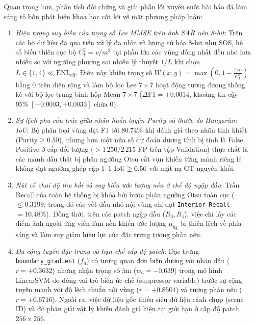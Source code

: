 Quan trọng hơn, phân tích đối chứng và giải phẫu lỗi xuyên suốt bài báo đã làm sáng tỏ bốn phát hiện khoa học cốt lõi về mặt phương pháp luận:
\begin{enumerate}
    \item \textit{Hiện tượng suy biến của trọng số Lee MMSE trên ảnh SAR nén 8-bit}: Trên các bộ dữ liệu đã qua tiền xử lý đa nhìn và lượng tử hóa 8-bit như SOS, hệ số biến thiên cục bộ $C_I^2 = v/m^2$ tại phần lớn các vùng đồng nhất đều nhỏ hơn nhiều so với ngưỡng phương sai nhiễu lý thuyết $1/L$ khi chọn $L \in \{1, 4\} \ll \text{ENL}_{\text{eff}}$. Điều này khiến trọng số $W(x, y) = \max(0, 1 - \frac{1/L}{C_I^2})$ bằng $0$ trên diện rộng và làm bộ lọc Lee $7 \times 7$ hoạt động tương đương thống kê với bộ lọc trung bình hộp Mean $7 \times 7$ ($\Delta\text{F1} = +0.0014$, khoảng tin cậy 95\% $[-0.0003, +0.0033]$ chứa 0).
    \item \textit{Sự lệch pha cấu trúc giữa nhãn huấn luyện Purity và thước đo Hungarian IoU}: Bộ phân loại vùng đạt F1 tới $80.74\%$ khi đánh giá theo nhãn tinh khiết ($\mathrm{Purity} \ge 0.50$), nhưng hơn một nửa số dự đoán dương tính bị tính là False Positive ở cấp đối tượng ($>1\,250 / 2\,215$ FP trên tập Validation) thực chất là các mảnh dầu thật bị phân ngưỡng Otsu cắt vụn khiến từng mảnh riêng lẻ không đạt ngưỡng ghép cặp 1--1 $\mathrm{IoU} \ge 0.50$ với mặt nạ GT nguyên khối.
    \item \textit{Nút cổ chai độ thu hồi và suy biến ước lượng nền ở chế độ ngập dầu}: Trần Recall của toàn hệ thống bị khóa bởi bước phân ngưỡng Otsu toàn cục ($\le 0.3199$, trong đó các vết dầu nhỏ nội vùng chỉ đạt \texttt{Interior Recall} $= 10.48\%$). Đồng thời, trên các patch ngập dầu ($R_3, R_4$), việc chỉ lấy các điểm ảnh ngoài ứng viên làm nền khiến ước lượng $\mu_{\text{bg}}$ bị thiên lệch về phía sáng và làm suy giảm hiệu lực của đặc trưng tương phản nền.
    \item \textit{Đa cộng tuyến đặc trưng và hạn chế cấp độ patch}: Đặc trưng \texttt{boundary\_gradient} ($f_6$) có tương quan đơn biến dương với nhãn dầu ($r = +0.3632$) nhưng nhận trọng số âm ($w_6 = -0.639$) trong mô hình LinearSVM do đóng vai trò biến ức chế (suppressor variable) trước sự cộng tuyến mạnh với độ lệch chuẩn nội vùng ($r = +0.8504$) và tương phản nền ($r = +0.6716$). Ngoài ra, việc dữ liệu gốc thiếu siêu dữ liệu cảnh chụp (scene ID) và độ phân giải vật lý khiến đánh giá hiện tại giới hạn ở cấp độ patch $256 \times 256$.
\end{enumerate}

